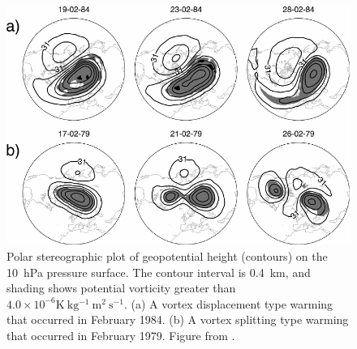 \begin{figure}
 \centering
 \noindent\includegraphics[width=\textwidth]{figures/chapter-intro/charlton_polvani_SSW.pdf}
 \caption[A split and displaced vortex event from \citet{Charlton2007}]{Polar
   stereographic plot of geopotential height (contours) on the 10~hPa pressure
   surface. The contour interval is 0.4~km, and shading shows potential
   vorticity greater than $4.0 \times 10^{-6}
   \mathrm{K~kg^{-1}~m^2~s^{-1}}$.
   (a) A vortex displacement type warming that occurred in February 1984. (b) A
   vortex splitting type warming that occurred in February 1979. Figure from
   \citet{Charlton2007}.}
 \label{fig:charlton_polvani_ssw}
\end{figure}

